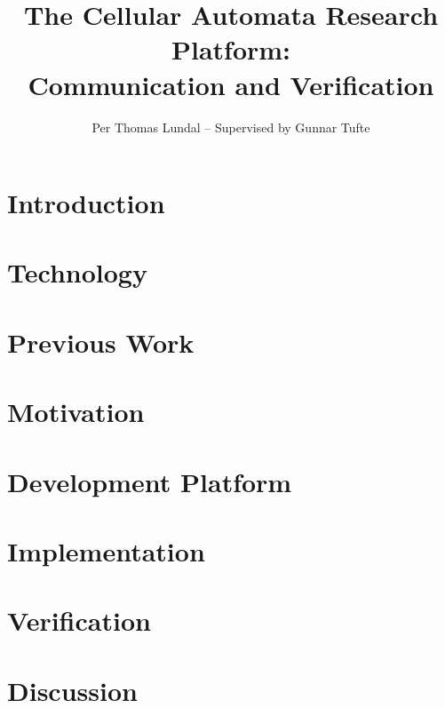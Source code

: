 \documentclass[a4paper]{IEEEtran}
\title{The Cellular Automata Research Platform: \\ Communication and Verification}
\author{Per Thomas Lundal -- Supervised by Gunnar Tufte}
\begin{document}
\maketitle

\begin{abstract}

    

\end{abstract}

\section{Introduction}

    

\section{Technology}
    \label{sec:background}
    

\section{Previous Work}
    \label{sec:previous-work}
    

\section{Motivation}
    \label{sec:motivation}
    

\section{Development Platform}
    \label{sec:development}
    

\section{Implementation}
    \label{sec:communication}
    

\section{Verification}
    \label{sec:verification}
    

\section{Discussion}
    \label{sec:discussion}
    
\end{document}
